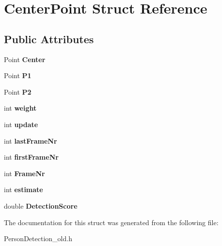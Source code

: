 \hypertarget{struct_center_point}{\section{Center\-Point Struct Reference}
\label{struct_center_point}
}
\subsection*{Public Attributes}
\begin{DoxyCompactItemize}
\item 
\hypertarget{struct_center_point_ae413940c08de0552f1de023b84cd640e}{Point {\bfseries Center}}\label{struct_center_point_ae413940c08de0552f1de023b84cd640e}

\item 
\hypertarget{struct_center_point_a8788e2195815bea38ddb58b42b5f9348}{Point {\bfseries P1}}\label{struct_center_point_a8788e2195815bea38ddb58b42b5f9348}

\item 
\hypertarget{struct_center_point_a59d6c7604886b684e049307258158e3f}{Point {\bfseries P2}}\label{struct_center_point_a59d6c7604886b684e049307258158e3f}

\item 
\hypertarget{struct_center_point_a063307e2f8f82c0e2c2d0d6f317207f4}{int {\bfseries weight}}\label{struct_center_point_a063307e2f8f82c0e2c2d0d6f317207f4}

\item 
\hypertarget{struct_center_point_afe861e746833163cf1f3d2b7ccab9721}{int {\bfseries update}}\label{struct_center_point_afe861e746833163cf1f3d2b7ccab9721}

\item 
\hypertarget{struct_center_point_abfd53681331d2457c0b51c55d7aae630}{int {\bfseries last\-Frame\-Nr}}\label{struct_center_point_abfd53681331d2457c0b51c55d7aae630}

\item 
\hypertarget{struct_center_point_a6c2432708d0704ac9e059102e68d6165}{int {\bfseries first\-Frame\-Nr}}\label{struct_center_point_a6c2432708d0704ac9e059102e68d6165}

\item 
\hypertarget{struct_center_point_a095fc62638dfc95b753aebe5e3b83a03}{int {\bfseries Frame\-Nr}}\label{struct_center_point_a095fc62638dfc95b753aebe5e3b83a03}

\item 
\hypertarget{struct_center_point_a399ff5fe10038332dec63f22f5e73164}{int {\bfseries estimate}}\label{struct_center_point_a399ff5fe10038332dec63f22f5e73164}

\item 
\hypertarget{struct_center_point_a3f3e95a167e7ba3b4062cbe8bd0ecf89}{double {\bfseries Detection\-Score}}\label{struct_center_point_a3f3e95a167e7ba3b4062cbe8bd0ecf89}

\end{DoxyCompactItemize}


The documentation for this struct was generated from the following file\-:\begin{DoxyCompactItemize}
\item 
Person\-Detection\-\_\-old.\-h\end{DoxyCompactItemize}
